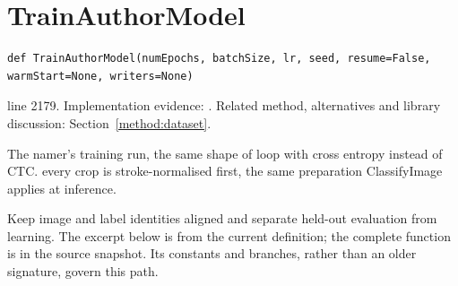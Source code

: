 \section{TrainAuthorModel}\label{fn:train:TrainAuthorModel}
\begin{lstlisting}[style=sig]
def TrainAuthorModel(numEpochs, batchSize, lr, seed, resume=False, warmStart=None, writers=None)
\end{lstlisting}
 line 2179. Implementation evidence: \cite{code2026}. Related method, alternatives and library discussion: Section~\ref{method:dataset}.


The namer's training run, the same shape of loop with cross entropy instead of CTC.  every crop is stroke-normalised first, the same preparation ClassifyImage applies at inference.


Keep image and label identities aligned and separate held-out evaluation from learning. The excerpt below is from the current definition; the complete function is in the source snapshot. Its constants and branches, rather than an older signature, govern this path.


